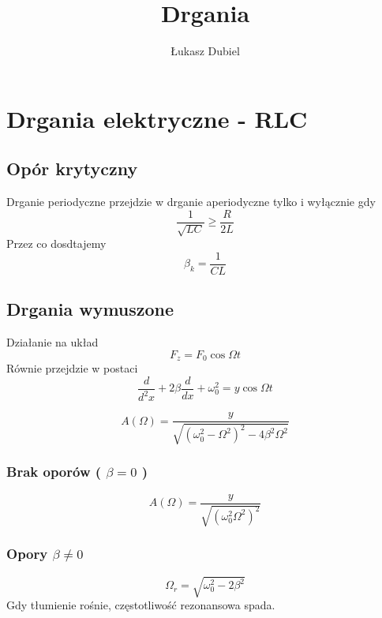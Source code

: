 \documentclass[11pt]{article}
\author{Łukasz Dubiel}
\title{Drgania }
\begin{document}
\maketitle
\section{Drgania elektryczne - RLC}
\subsection{Opór krytyczny}
Drganie periodyczne przejdzie w drganie aperiodyczne tylko i wyłącznie gdy
$$ \frac{1}{\sqrt{LC}} \geq \frac{R}{2L} $$
Przez co dosdtajemy
$$ \beta_k = \frac{1}{CL} $$

\subsection{Drgania wymuszone}
Działanie na układ $$F_z = F_0 \cos{\Omega t}$$
Równie przejdzie w postaci
$$ \frac{d}{d^2x} + 2\beta\frac{d}{dx} + \omega_0^2 = y \cos{\Omega t}$$

$$ A(\Omega) = \frac{y}{\sqrt{(\omega_0^2 - \Omega^2)^2 - 4 \beta^2 \Omega^2}} $$

\subsubsection{Brak oporów ( $ \beta = 0 $ )}

$$ A(\Omega) = \frac{y}{\sqrt{(\omega_0^2 \Omega^2)^2}} $$

\subsubsection{Opory $ \beta \not = 0$}
$$ \Omega_r = \sqrt{\omega_0^2 - 2\beta^2} $$
Gdy tłumienie rośnie, częstotliwość rezonansowa spada.
\end{document}
